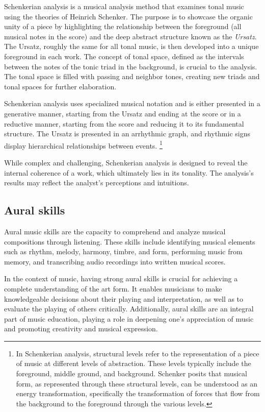 Schenkerian analysis is a musical analysis method that examines tonal music using the theories of Heinrich Schenker. The purpose is to showcase the organic unity of a piece by highlighting the relationship between the foreground (all musical notes in the score) and the deep abstract structure known as the \textit{Ursatz}. The Ursatz, roughly the same for all tonal music, is then developed into a unique foreground in each work. The concept of tonal space, defined as the intervals between the notes of the tonic triad in the background, is crucial to the analysis. The tonal space is filled with passing and neighbor tones, creating new triads and tonal spaces for further elaboration.

Schenkerian analysis uses specialized musical notation and is either presented in a generative manner, starting from the Ursatz and ending at the score or in a reductive manner, starting from the score and reducing it to its fundamental structure. The Ursatz is presented in an arrhythmic graph, and rhythmic signs display hierarchical relationships between events. \footnote{In Schenkerian analysis, structural levels refer to the representation of a piece of music at different levels of abstraction. These levels typically include the foreground, middle ground, and background. Schenker posits that musical form, as represented through these structural levels, can be understood as an energy transformation, specifically the transformation of forces that flow from the background to the foreground through the various levels.}

While complex and challenging, Schenkerian analysis is designed to reveal the internal coherence of a work, which ultimately lies in its tonality. The analysis's results may reflect the analyst's perceptions and intuitions.

\subsection{Aural skills}

Aural music skills are the capacity to comprehend and analyze musical compositions through listening. These skills include identifying musical elements such as rhythm, melody, harmony, timbre, and form, performing music from memory, and transcribing audio recordings into written musical scores.

In the context of music, having strong aural skills is crucial for achieving a complete understanding of the art form. It enables musicians to make knowledgeable decisions about their playing and interpretation, as well as to evaluate the playing of others critically. Additionally, aural skills are an integral part of music education, playing a role in deepening one's appreciation of music and promoting creativity and musical expression.

